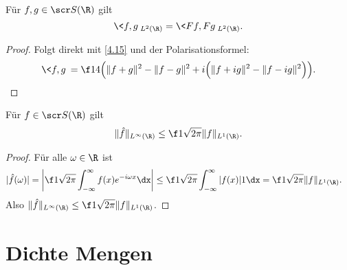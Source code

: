 \begin{kor} \label{4.16}
	Für $f,g \in \scr S(\R)$ gilt
	\[
		\<f,g\>_{L^2(\R)} = \< Ff, Fg\>_{L^2(\R)}.
	\]
	\begin{proof}
		Folgt direkt mit \ref{4.15} und der Polarisationsformel:
		\[
			\<f,g\> = \f 14 \Big( \|f+g\|^2 - \|f-g\|^2 + i \Big(\|f+ig\|^2 - \|f-ig\|^2 \Big) \Big).
		\]
	\end{proof}
\end{kor}

\begin{st} \label{4.17}
	Für $f \in \scr S(\R)$ gilt
	\[
		\| \hat f \|_{L^\infty(\R)} \le \f 1{\sqrt{2\pi}} \|f\|_{L^1(\R)}.
	\]
	\begin{proof}
		Für alle $\omega \in \R$ ist
		\begin{align*}
			|\hat f(\omega)|
			&= \bigg| \f 1{\sqrt{2\pi}} \int_{-\infty}^\infty f(x) e^{-i\omega x} \dx \bigg|
			\le \f 1{\sqrt{2\pi}} \int_{-\infty}^\infty |f(x)| 1 \dx
			= \f 1{\sqrt{2\pi}} \|f\|_{L^1(\R)}.
		\end{align*}
		Also $\| \hat f \|_{L^\infty(\R)} \le \f 1{\sqrt{2\pi}} \|f\|_{L^1(\R)}$.
	\end{proof}
\end{st}


\section{Dichte Mengen}


